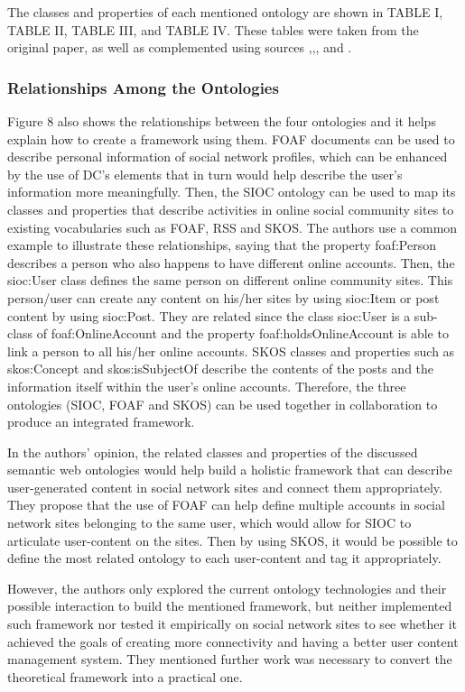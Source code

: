 \documentclass[10pt,journal,compsoc]{IEEEtran}
\begin{document}
The classes and properties of each mentioned ontology are shown in TABLE I, TABLE II, TABLE III, and TABLE IV. These tables were taken from the original paper, as well as complemented using sources \cite{skos},\cite{foaf},\cite{sioc}, and \cite{dcmi}. 

\subsubsection{Relationships Among the Ontologies}

Figure 8 also shows the relationships between the four ontologies and it helps explain how to create a framework using them. FOAF documents can be used to describe personal information of social network profiles, which can be enhanced by the use of DC’s elements that in turn would help describe the user’s information more meaningfully. Then, the SIOC ontology can be used to map its classes and properties that describe activities in online social community sites to existing vocabularies such as FOAF, RSS and SKOS. The authors use a common example to illustrate these relationships, saying that the property foaf:Person describes a person who also happens to have different online accounts. Then, the sioc:User class defines the same person on different online community sites. This person/user can create any content on his/her sites by using sioc:Item or post content by using sioc:Post. They are related since the class sioc:User is a sub-class of foaf:OnlineAccount and the property foaf:holdsOnlineAccount is able to link a person to all his/her online accounts. SKOS classes and properties such as skos:Concept and skos:isSubjectOf describe the contents of the posts and the information itself within the user’s online accounts. Therefore, the three ontologies (SIOC, FOAF and SKOS) can be used together in collaboration to produce an integrated framework.


In the authors' opinion, the related classes and properties of the discussed semantic web ontologies would help build a holistic framework that can describe user-generated content in social network sites and connect them appropriately. They propose that the use of FOAF can help define multiple accounts in social network sites belonging to the same user, which would allow for SIOC to articulate user-content on the sites. Then by using SKOS, it would be possible to define the most related ontology to each user-content and tag it appropriately.

However, the authors only explored the current ontology technologies and their possible interaction to build the mentioned framework, but neither implemented such framework nor tested it empirically on social network sites to see whether it achieved the goals of creating more connectivity and having a better user content management system. They mentioned further work was necessary to convert the theoretical framework into a practical one.
\end{document}
